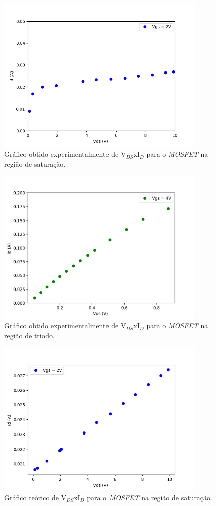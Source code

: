 \documentclass{article}
\begin{document}
\begin{figure}[h!]
    \centering
    \includegraphics[height=7.5cm]{imgSource/vgs2_exp.jpg}
    \caption{Gráfico obtido experimentalmente de V$_{DS}$xI$_{D}$ para o \emph{MOSFET} na região de saturação.}
    \label{fig:mos_sat}
\end{figure}

\begin{figure}[h!]
    \centering
    \includegraphics[height=7.5cm]{imgSource/vgs4_exp.jpg}
    \caption{Gráfico obtido experimentalmente de V$_{DS}$xI$_{D}$ para o \emph{MOSFET} na região de triodo.}
    \label{fig:mos_tri}
\end{figure}

\begin{figure}[h!]
    \centering
    \includegraphics[height=7.5cm]{imgSource/vgs2_teo.jpg}
    \caption{Gráfico teórico de V$_{DS}$xI$_{D}$ para o \emph{MOSFET} na região de saturação.}
    \label{fig:mos_sat_teo}
\end{figure}
\end{document}
